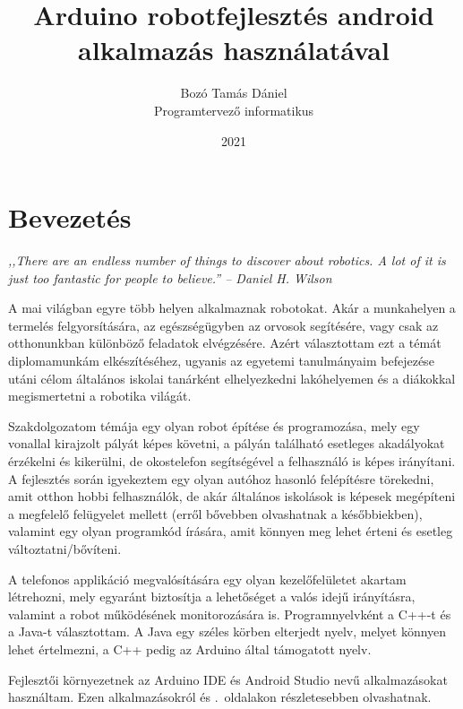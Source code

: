 \documentclass[]{thesis-ekf}
\theoremstyle{definition}
\begin{document}
\title{Arduino robotfejlesztés android alkalmazás használatával}
\author{Bozó Tamás Dániel\\Programtervező informatikus}
\date{2021}
\maketitle
\tableofcontents
\chapter*{Bevezetés}
\begin{flushright}
	\emph{,,There are an endless number of things to discover about robotics. A lot of it is just too fantastic for people to believe.'' -- Daniel H. Wilson}
\end{flushright}

A mai világban egyre több helyen alkalmaznak robotokat. Akár a munkahelyen a termelés felgyorsítására, az egészségügyben az orvosok segítésére, vagy csak az otthonunkban különböző feladatok elvégzésére. Azért választottam ezt a témát diplomamunkám elkészítéséhez, ugyanis az egyetemi tanulmányaim befejezése utáni célom általános iskolai tanárként elhelyezkedni lakóhelyemen és a diákokkal megismertetni a robotika világát.

Szakdolgozatom témája egy olyan robot építése és programozása, mely egy vonallal kirajzolt pályát képes követni, a pályán található esetleges akadályokat érzékelni és kikerülni, de okostelefon segítségével a felhasználó is képes irányítani. A fejlesztés során igyekeztem egy olyan autóhoz hasonló felépítésre törekedni, amit otthon hobbi felhasználók, de akár általános iskolások is képesek megépíteni a megfelelő felügyelet mellett (erről bővebben olvashatnak a későbbiekben), valamint egy olyan programkód írására, amit könnyen meg lehet érteni és esetleg változtatni/bővíteni.

A telefonos applikáció megvalósítására egy olyan kezelőfelületet akartam létrehozni, mely egyaránt biztosítja a lehetőséget a valós idejű irányításra, valamint a robot működésének monitorozására is.
Programnyelvként a C++-t és a Java-t választottam. A Java egy széles körben elterjedt nyelv, melyet könnyen lehet értelmezni, a C++ pedig az Arduino által támogatott nyelv.

Fejlesztői környezetnek az Arduino IDE és Android Studio nevű alkalmazásokat használtam. Ezen alkalmazásokról  és \az{\pageref{android-studio}}.~oldalakon részletesebben olvashatnak.
\end{document}
